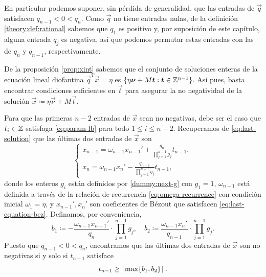 En particular podemos suponer, sin pérdida de generalidad, que las entradas de  $\vec{q}$ satisfacen
$q_{n-1} < 0 < q_n$. Como $\vec{q}$ no tiene entradas nulas, de la
definición \ref{theory:def:rational} sabemos que $q_1$ es positivo y, por suposición de este capítulo,
alguna entrada $q_j$ es negativa, así que podemos permutar estas entradas con las de $q_n$ y
$q_{n-1}$, respectivamente.

De la proposición \ref{prop:xint} sabemos que el conjunto de soluciones enteras de la ecuación
lineal diofantina $\vec{q}^T\vec{x} = \eta$ es $\lbrace \eta\boldsymbol{\nu} + M\boldsymbol{t} \vcentcolon \boldsymbol{t}
\in \mathbb{Z}^{n-1} \rbrace$. Así pues, basta encontrar condiciones suficientes en $\vec{t}$ para asegurar la no
negatividad de la solución $\vec{x} \coloneq \eta\vec{\nu} + M\vec{t}$.

Para que las primeras $n - 2$ entradas de $\vec{x}$ sean no negativas, debe ser el caso que $t_i \in
\mathbb{Z}$ satisfaga \eqref{eq:param-lb} para todo $1 \leq i \leq n - 2$. Recuperamos de
\eqref{eq:last-solution} que las últimas dos entradas de $\vec{x}$ son
\begin{equation*}
	\begin{cases}
		x_{n-1} = \omega_{n-1}x_{n-1}' + \frac{q_n}{\prod_{j=1}^{n-1}g_j}t_{n-1}, \\
		x_n = \omega_{n-1}x_n' - \frac{q_{n-1}}{\prod_{j=1}^{n-1}g_j}t_{n-1},
	\end{cases}
\end{equation*}
donde los enteros $g_i$ están definidos por \eqref{dummy:next-g} con $g_1 = 1$, $\omega_{n-1}$ está
definida a través de la relación de recurrencia \eqref{eq:omega-recurrence} con condición inicial
$\omega_1 = \eta$, y $x_{n-1}', x_n'$ son coeficientes de Bézout que satisfacen
\eqref{eq:last-equation-bez}. Definamos, por conveniencia,
\begin{equation}
	\label{eq:lr-bounds}
	b_1 \coloneq -\frac{\omega_{n-1}x_{n-1}'}{q_n} \cdot \prod_{j=1}^{n-1}g_j, \quad
	b_2 \coloneq \frac{\omega_{n-1}x_{n}'}{q_{n-1}} \cdot \prod_{j=1}^{n-1}g_j.
\end{equation}
Puesto que $q_{n-1} < 0 < q_n$, encontramos que las últimas dos entradas de
$\vec{x}$ son no negativas si y solo si $t_{n-1}$ satisface
\begin{equation}
	\label{eq:feasible-param:collapsed}
	t_{n-1} \geq \left\lceil \max\lbrace b_1, b_2 \rbrace \right\rceil.
\end{equation}


